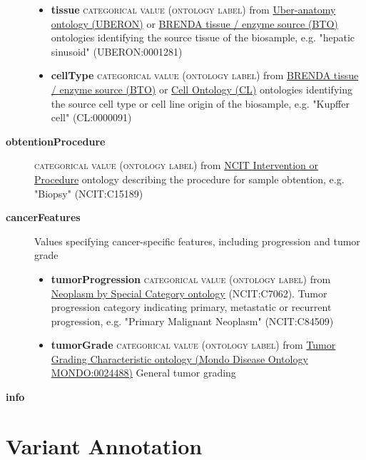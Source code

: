 \documentclass[a4paper, 10pt]{article}        %
\begin{document}
\begin{description}
\begin{itemize}
	\item[] \textbf{tissue}  {\textsc{categorical value (ontology label)}} from \href{https://www.ebi.ac.uk/ols/ontologies/uberon}{Uber-anatomy ontology (UBERON)} or \href{https://www.ebi.ac.uk/ols/ontologies/bto}{BRENDA tissue / enzyme source (BTO)} ontologies identifying the source tissue of the biosample, e.g. "hepatic sinusoid" (UBERON:0001281)
	\item[] \textbf{cellType} {\textsc{categorical value (ontology label)}} from \href{https://www.ebi.ac.uk/ols/ontologies/bto}{BRENDA tissue / enzyme source (BTO)} or \href{https://www.ebi.ac.uk/ols/ontologies/cl}{Cell Ontology (CL)} ontologies identifying the source cell type or cell line origin of the biosample, e.g. "Kupffer cell" (CL:0000091)
	\end{itemize}
	\item[\textbf{obtentionProcedure}] {\textsc{categorical value (ontology label)}} from \href{https://www.ebi.ac.uk/ols/ontologies/ncit/terms?iri=http%3A%2F%2Fpurl.obolibrary.org%2Fobo%2FNCIT_C25218&viewMode=All&siblings=false}{NCIT Intervention or Procedure} ontology describing the procedure for sample obtention, e.g. "Biopsy" (NCIT:C15189)
	\item[\textbf{cancerFeatures}] Values specifying cancer-specific features, including progression and tumor grade
	\begin{itemize}
			\item[] \textbf{tumorProgression} {\textsc{categorical value (ontology label)}} from \href{https://www.ebi.ac.uk/ols/ontologies/ncit/terms?iri=http%3A%2F%2Fpurl.obolibrary.org%2Fobo%2FNCIT_C7062&viewMode=All&siblings=false}{Neoplasm by Special Category ontology} (NCIT:C7062). Tumor progression category indicating primary, metastatic or recurrent progression, e.g. "Primary Malignant Neoplasm" (NCIT:C84509)
			\item[] \textbf{tumorGrade} {\textsc{categorical value (ontology label)}} from \href{https://www.ebi.ac.uk/ols/ontologies/mondo/terms?iri=http%3A%2F%2Fpurl.obolibrary.org%2Fobo%2FMONDO_0024488}{Tumor Grading Characteristic ontology (Mondo Disease Ontology MONDO:0024488)} General tumor grading  	
\end{itemize} 

\item[\textbf{info}] 
 \end{description}
 



  \section*{ {\color{teal} Variant Annotation}}
  
\end{document}
